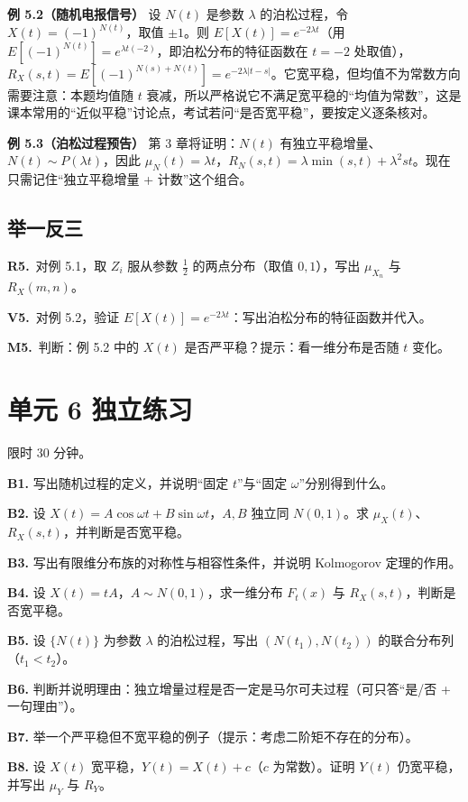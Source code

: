 \documentclass[UTF8,a4paper,11pt]{ctexart}
\newcommand{\CompactQuestion}[2]{\par\noindent\textbf{#1.}\ #2\par\vspace{.8em}}
\begin{document}
\textbf{例 5.2（随机电报信号）} 设 $N(t)$ 是参数 $\lambda$ 的泊松过程，令 $X(t)=(-1)^{N(t)}$，取值 $\pm1$。则 $E[X(t)]=e^{-2\lambda t}$（用 $E[(-1)^{N(t)}]=e^{\lambda t(-2)}$，即泊松分布的特征函数在 $t=-2$ 处取值），$R_X(s,t)=E[(-1)^{N(s)+N(t)}]=e^{-2\lambda|t-s|}$。它宽平稳，但均值不为常数方向需要注意：本题均值随 $t$ 衰减，所以严格说它不满足宽平稳的“均值为常数”，这是课本常用的“近似平稳”讨论点，考试若问“是否宽平稳”，要按定义逐条核对。

\textbf{例 5.3（泊松过程预告）} 第 3 章将证明：$N(t)$ 有独立平稳增量、$N(t)\sim P(\lambda t)$，因此 $\mu_{N}(t)=\lambda t$，$R_N(s,t)=\lambda\min(s,t)+\lambda^2st$。现在只需记住“独立平稳增量 + 计数”这个组合。

\subsection{举一反三}
\CompactQuestion{R5}{对例 5.1，取 $Z_i$ 服从参数 $\frac12$ 的两点分布（取值 $0,1$），写出 $\mu_{X_n}$ 与 $R_X(m,n)$。}
\CompactQuestion{V5}{对例 5.2，验证 $E[X(t)]=e^{-2\lambda t}$：写出泊松分布的特征函数并代入。}
\CompactQuestion{M5}{判断：例 5.2 中的 $X(t)$ 是否严平稳？提示：看一维分布是否随 $t$ 变化。}
\clearpage
{}
\section{单元 6 独立练习}
限时 30 分钟。

\textbf{B1.} 写出随机过程的定义，并说明“固定 $t$”与“固定 $\omega$”分别得到什么。

\textbf{B2.} 设 $X(t)=A\cos\omega t+B\sin\omega t$，$A,B$ 独立同 $N(0,1)$。求 $\mu_X(t)$、$R_X(s,t)$，并判断是否宽平稳。

\textbf{B3.} 写出有限维分布族的对称性与相容性条件，并说明 Kolmogorov 定理的作用。

\textbf{B4.} 设 $X(t)=tA$，$A\sim N(0,1)$，求一维分布 $F_t(x)$ 与 $R_X(s,t)$，判断是否宽平稳。

\textbf{B5.} 设 $\{N(t)\}$ 为参数 $\lambda$ 的泊松过程，写出 $(N(t_1),N(t_2))$ 的联合分布列（$t_1<t_2$）。

\textbf{B6.} 判断并说明理由：独立增量过程是否一定是马尔可夫过程（可只答“是/否 + 一句理由”）。

\textbf{B7.} 举一个严平稳但不宽平稳的例子（提示：考虑二阶矩不存在的分布）。

\textbf{B8.} 设 $X(t)$ 宽平稳，$Y(t)=X(t)+c$（$c$ 为常数）。证明 $Y(t)$ 仍宽平稳，并写出 $\mu_Y$ 与 $R_Y$。
\end{document}
